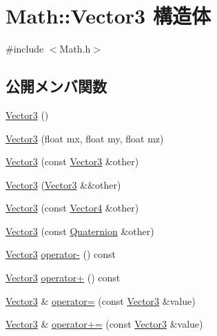 \hypertarget{struct_math_1_1_vector3}{}\section{Math\+:\+:Vector3 構造体}
\label{struct_math_1_1_vector3}


{\ttfamily \#include $<$Math.\+h$>$}

\subsection*{公開メンバ関数}
\begin{DoxyCompactItemize}
\item 
\mbox{\hyperlink{struct_math_1_1_vector3_a0f49191f7e001e7f7ae1cb49522118b4}{Vector3}} ()
\item 
\mbox{\hyperlink{struct_math_1_1_vector3_a9432186cfab2eb9cdcda298ed06bcea7}{Vector3}} (float mx, float my, float mz)
\item 
\mbox{\hyperlink{struct_math_1_1_vector3_aad6b7d343e46f9d930139ebf3195a886}{Vector3}} (const \mbox{\hyperlink{struct_math_1_1_vector3}{Vector3}} \&other)
\item 
\mbox{\hyperlink{struct_math_1_1_vector3_a96db7d8e6ad600722898a4b1cacf49b7}{Vector3}} (\mbox{\hyperlink{struct_math_1_1_vector3}{Vector3}} \&\&other)
\item 
\mbox{\hyperlink{struct_math_1_1_vector3_a24b565cff89d2bd9310b047bbf24de06}{Vector3}} (const \mbox{\hyperlink{struct_math_1_1_vector4}{Vector4}} \&other)
\item 
\mbox{\hyperlink{struct_math_1_1_vector3_abec6ffc22cfc35a66faa87410a52b772}{Vector3}} (const \mbox{\hyperlink{struct_math_1_1_quaternion}{Quaternion}} \&other)
\item 
\mbox{\hyperlink{struct_math_1_1_vector3}{Vector3}} \mbox{\hyperlink{struct_math_1_1_vector3_abf941de6e1724901c46d5e9e1448358f}{operator-\/}} () const
\item 
\mbox{\hyperlink{struct_math_1_1_vector3}{Vector3}} \mbox{\hyperlink{struct_math_1_1_vector3_ae593c862c998667ab02c426e13477daa}{operator+}} () const
\item 
\mbox{\hyperlink{struct_math_1_1_vector3}{Vector3}} \& \mbox{\hyperlink{struct_math_1_1_vector3_a21c516ed075cd64f2fb3de597ccb9554}{operator=}} (const \mbox{\hyperlink{struct_math_1_1_vector3}{Vector3}} \&value)
\item 
\mbox{\hyperlink{struct_math_1_1_vector3}{Vector3}} \& \mbox{\hyperlink{struct_math_1_1_vector3_a0bfa1db9b0bb237c8120b5e98be1187e}{operator+=}} (const \mbox{\hyperlink{struct_math_1_1_vector3}{Vector3}} \&value)

\end{DoxyCompactItemize}
